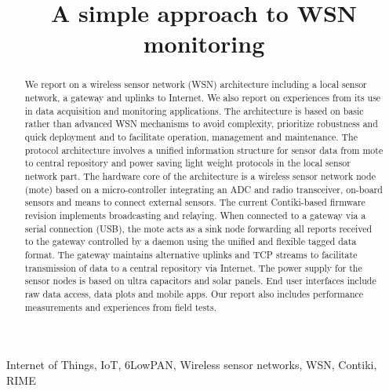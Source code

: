 \documentclass[conference, a4paper,10pt,twocolumn]{IEEEtran}
\begin{document}
\title{A simple approach to WSN monitoring}



\maketitle
\begin{abstract}

We report on a wireless sensor network (WSN) architecture including a 
local sensor network, a gateway and uplinks to Internet. We also report 
on experiences from its use in data acquisition and monitoring applications.
The architecture is based on basic rather than advanced WSN mechanisms 
to avoid complexity, prioritize robustness and quick deployment and to 
facilitate operation, management and maintenance.
The protocol architecture involves a unified information structure for 
sensor data from mote to central repository and power saving light 
weight protocols in the local sensor network part.
The hardware core of the architecture is a wireless sensor network node
(mote) based on a micro-controller integrating an ADC and radio
transceiver, on-board sensors and means to connect external sensors. The 
current Contiki-based firmware revision implements broadcasting and 
relaying. When connected to a gateway via a serial connection (USB), the 
mote acts as a sink node forwarding all reports received to the gateway 
controlled by a daemon using the unified and flexible tagged  data format.
The gateway maintains alternative uplinks and TCP streams to facilitate
transmission of data to a central repository via Internet.
The power supply for the sensor nodes is based on ultra capacitors and 
solar panels.
End user interfaces include raw data access, data plots and
mobile apps. Our report also includes performance measurements and
experiences from field tests.

\end{abstract}

\begin{IEEEkeywords} 
Internet of Things, IoT, 6LowPAN, Wireless sensor networks, WSN, Contiki, RIME
 \end{IEEEkeywords}



%
\end{document}
